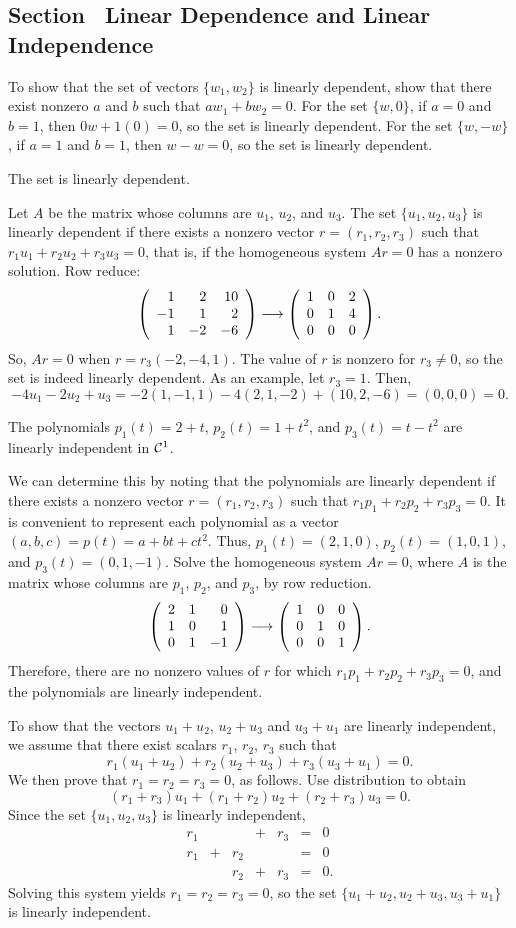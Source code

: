 \subsection*{Section~\protect{\ref{S:5.4}} Linear Dependence and Linear
Independence}

To show that the set of vectors $\{w_1,w_2\}$ is linearly dependent,
show that there exist nonzero $a$ and $b$ such that
$aw_1 + bw_2 = 0$.  For the set $\{w,0\}$, if $a = 0$ and $b = 1$,
then $0w + 1(0) = 0$, so the set is linearly dependent.  For the
set $\{w,-w\}$, if $a = 1$ and $b = 1$, then
$w - w = 0$, so the set is linearly dependent.

\ans The set is linearly dependent.

\soln Let $A$ be the matrix whose columns are $u_1$, $u_2$, and $u_3$. 
The set $\{u_1,u_2,u_3\}$ is linearly dependent if there exists
a nonzero vector $r = (r_1,r_2,r_3)$ such that $r_1u_1 + r_2u_2 +
r_3u_3 = 0$, that is, if the homogeneous system $Ar = 0$ has a
nonzero solution.  Row reduce:
\[
\left(\begin{array}{rrr} 1 & 2 & 10 \\ -1 & 1 & 2 \\ 1 & -2 & -6\end{array}\right) \longrightarrow
\left(\begin{array}{rrr} 1 & 0 & 2 \\ 0 & 1 & 4 \\ 0 & 0 & 0\end{array}\right).
\]
So, $Ar = 0$ when $r = r_3(-2,-4,1)$.
The value of $r$ is nonzero for $r_3 \neq 0$, so the set is indeed
linearly dependent.
As an example, let $r_3 = 1$.  Then,
\[
-4u_1 - 2u_2 + u_3 = -2(1,-1,1) - 4(2,1,-2) + (10,2,-6) =
(0,0,0) = 0.
\]

\ans The polynomials $p_1(t) = 2 + t$, $p_2(t) = 1 + t^2$, and $p_3(t) =
t - t^2$ are linearly independent in ${\cal C}^1$.  

\soln We can determine this
by noting that the polynomials are linearly dependent if there exists
a nonzero vector $r = (r_1,r_2,r_3)$ such that $r_1p_1 + r_2p_2 +
r_3p_3 = 0$.  It is convenient to represent each polynomial as a
vector $(a,b,c) = p(t) = a + bt + ct^2$.  Thus, $p_1(t) = (2,1,0)$, 
$p_2(t) = (1,0,1)$, and $p_3(t) = (0,1,-1)$.  Solve the homogeneous
system $Ar = 0$, where $A$ is the matrix whose columns are $p_1$,
$p_2$, and $p_3$, by row reduction.
\[ \left(\begin{array}{rrr} 2 & 1 & 0 \\ 1 & 0 & 1 \\ 0 & 1 & -1\end{array}\right) \longrightarrow
\left(\begin{array}{rrr} 1 & 0 & 0 \\ 0 & 1 & 0 \\ 0 & 0 & 1\end{array}\right). \]
Therefore, there are no nonzero values of $r$ for which $r_1p_1 + 
r_2p_2 + r_3p_3 = 0$, and the polynomials are linearly independent.

To show that the vectors $u_1 + u_2$, $u_2 + u_3$ and $u_3 + u_1$
are linearly independent, we assume that there exist scalars $r_1$,
$r_2$, $r_3$ such that
\[ r_1(u_1 + u_2) + r_2(u_2 + u_3) + r_3(u_3 + u_1) = 0. \]
We then prove that $r_1 = r_2 = r_3 = 0$, as follows.
Use distribution to obtain
\[ (r_1 + r_3)u_1 + (r_1 + r_2)u_2 + (r_2 + r_3)u_3 = 0. \]
Since the set $\{u_1,u_2,u_3\}$ is linearly independent,
\[ \begin{array}{rrrrrcl}
r_1 & & & + & r_3 & = & 0 \\
r_1 & + & r_2 & & & = & 0 \\
& & r_2 & + & r_3 & = & 0. \end{array} \]
Solving this system yields $r_1 = r_2 = r_3 = 0$,
so the set $\{u_1 + u_2,u_2 + u_3,u_3 + u_1\}$ is linearly
independent.

